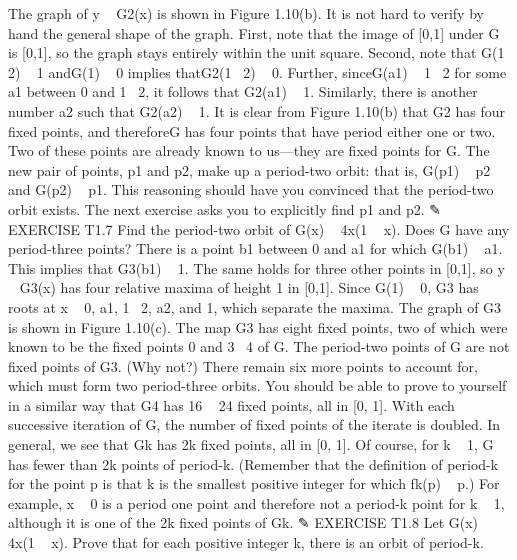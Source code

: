 \documentclass{article}
\begin{document}
The graph of y   G2(x) is shown in Figure 1.10(b). It is not hard to verify
by hand the general shape of the graph. First, note that the image of [0,1] under
G is [0,1], so the graph stays entirely within the unit square. Second, note that
G(1  2)   1 andG(1)   0 implies thatG2(1  2)   0. Further, sinceG(a1)   1  2
for some a1 between 0 and 1  2, it follows that G2(a1)   1. Similarly, there is
another number a2 such that G2(a2)   1.
It is clear from Figure 1.10(b) that G2 has four fixed points, and thereforeG
has four points that have period either one or two. Two of these points are already
known to us—they are fixed points for G. The new pair of points, p1 and p2, make
up a period-two orbit: that is, G(p1)   p2 and G(p2)   p1. This reasoning should
have you convinced that the period-two orbit exists. The next exercise asks you
to explicitly find p1 and p2.
✎ EXERCISE T1.7
Find the period-two orbit of G(x)   4x(1   x).
Does G have any period-three points? There is a point b1 between 0 and a1
for which G(b1)   a1. This implies that G3(b1)   1. The same holds for three
other points in [0,1], so y   G3(x) has four relative maxima of height 1 in [0,1].
Since G(1)   0, G3 has roots at x   0, a1, 1  2, a2, and 1, which separate the
maxima. The graph of G3 is shown in Figure 1.10(c).
The map G3 has eight fixed points, two of which were known to be the
fixed points 0 and 3  4 of G. The period-two points of G are not fixed points of
G3. (Why not?) There remain six more points to account for, which must form
two period-three orbits. You should be able to prove to yourself in a similar way
that G4 has 16   24 fixed points, all in [0, 1]. With each successive iteration of
G, the number of fixed points of the iterate is doubled. In general, we see that Gk
has 2k fixed points, all in [0, 1]. Of course, for k   1, G has fewer than 2k points
of period-k. (Remember that the definition of period-k for the point p is that k is
the smallest positive integer for which fk(p)   p.) For example, x   0 is a period
one point and therefore not a period-k point for k   1, although it is one of the
2k fixed points of Gk.
✎ EXERCISE T1.8
Let G(x)   4x(1   x). Prove that for each positive integer k, there is an
orbit of period-k.
\end{document}
